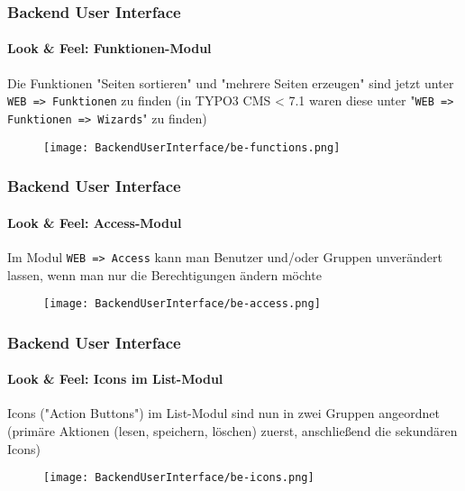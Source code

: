 \begin{frame}[fragile]
	\frametitle{Backend User Interface}
	\framesubtitle{Look \& Feel: Funktionen-Modul}

	Die Funktionen "Seiten sortieren" und "mehrere Seiten erzeugen" sind jetzt unter \texttt{WEB => Funktionen} zu finden\newline
	\smaller(in TYPO3 CMS < 7.1 waren diese unter "\texttt{WEB => Funktionen => Wizards}" zu finden)

	\begin{figure}
		\texttt{[image: BackendUserInterface/be-functions.png]}
	\end{figure}


\end{frame}


\begin{frame}[fragile]
	\frametitle{Backend User Interface}
	\framesubtitle{Look \& Feel: Access-Modul}

	Im Modul \texttt{WEB => Access} kann man Benutzer und/oder Gruppen unverändert
	lassen, wenn man nur die Berechtigungen ändern möchte

	\begin{figure}
		\texttt{[image: BackendUserInterface/be-access.png]}
	\end{figure}

\end{frame}


\begin{frame}[fragile]
	\frametitle{Backend User Interface}
	\framesubtitle{Look \& Feel: Icons im List-Modul}

	Icons ("Action Buttons") im List-Modul sind nun in zwei Gruppen angeordnet\newline
	\smaller(primäre Aktionen (lesen, speichern, löschen) zuerst, anschließend die sekundären Icons)

	\begin{figure}
		\texttt{[image: BackendUserInterface/be-icons.png]}
	\end{figure}

\end{frame}

